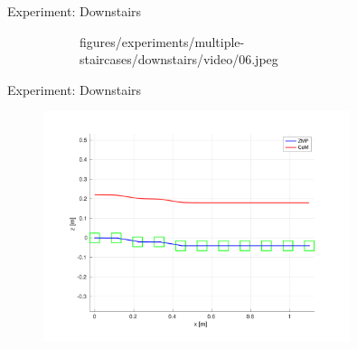 \documentclass[10pt]{beamer}
\begin{document}
\begin{frame}{Experiment: Downstairs}
\begin{figure}
\begin{subfigure}{0.40\textwidth}
				{figures/experiments/multiple-staircases/downstairs/video/06.jpeg}
		\end{subfigure}
	\end{figure}
\end{frame}

\begin{frame}{Experiment: Downstairs}	
	\begin{figure}
		\centering
		\includegraphics[width=0.8\textwidth]
				{figures/experiments/multiple-staircases/downstairs/xz-plot-2cm.pdf}
	\end{figure}
\end{frame}
\end{document}
